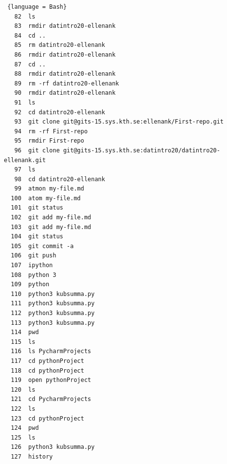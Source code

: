 \documentclass{article}
\begin{document}
\begin{lstlisting} {language = Bash}
   82  ls
   83  rmdir datintro20-ellenank
   84  cd ..
   85  rm datintro20-ellenank
   86  rmdir datintro20-ellenank
   87  cd ..
   88  rmdir datintro20-ellenank
   89  rm -rf datintro20-ellenank
   90  rmdir datintro20-ellenank
   91  ls
   92  cd datintro20-ellenank
   93  git clone git@gits-15.sys.kth.se:ellenank/First-repo.git
   94  rm -rf First-repo
   95  rmdir First-repo
   96  git clone git@gits-15.sys.kth.se:datintro20/datintro20-ellenank.git
   97  ls
   98  cd datintro20-ellenank
   99  atmon my-file.md
  100  atom my-file.md
  101  git status
  102  git add my-file.md
  103  git add my-file.md
  104  git status
  105  git commit -a
  106  git push
  107  ipython
  108  python 3
  109  python
  110  python3 kubsumma.py
  111  python3 kubsumma.py
  112  python3 kubsumma.py
  113  python3 kubsumma.py
  114  pwd
  115  ls
  116  ls PycharmProjects
  117  cd pythonProject
  118  cd pythonProject
  119  open pythonProject
  120  ls 
  121  cd PycharmProjects
  122  ls 
  123  cd pythonProject
  124  pwd
  125  ls
  126  python3 kubsumma.py
  127  history
\end{lstlisting}

\printbibliography
\end{document}
